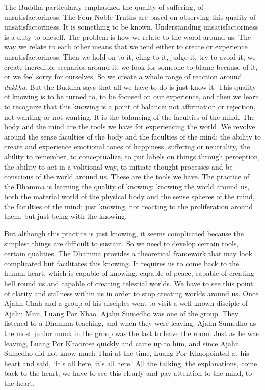 The Buddha particularly emphasized the quality of suffering, of
unsatisfactoriness. The Four Noble Truths are based on observing this
quality of unsatisfactoriness. It is something to be known.
Understanding unsatisfactoriness is a duty to oneself. The problem is
how we relate to the world around us. The way we relate to each other
means that we tend either to create or experience unsatisfactoriness.
Then we hold on to it, cling to it, judge it, try to avoid it; we create
incredible scenarios around it, we look for someone to blame because of
it, or we feel sorry for ourselves. So we create a whole range of
reaction around \emph{dukkha}. But the Buddha says that all we have to
do is just know it. This quality of knowing is to be turned to, to be
focused on our experience, and then we learn to recognize that this
knowing is a point of balance: not affirmation or rejection, not wanting
or not wanting. It is the balancing of the faculties of the mind. The
body and the mind are the tools we have for experiencing the world. We
revolve around the sense faculties of the body and the faculties of the
mind: the ability to create and experience emotional tones of happiness,
suffering or neutrality, the ability to remember, to conceptualize, to
put labels on things through perception, the ability to act in a
volitional way, to initiate thought processes and be conscious of the
world around us. These are the tools we have. The practice of the Dhamma
is learning the quality of knowing: knowing the world around us, both
the material world of the physical body and the sense spheres of the
mind, the faculties of the mind; just knowing, not reacting to the
proliferation around them, but just being with the knowing.

But although this practice is just knowing, it seems complicated because
the simplest things are difficult to sustain. So we need to develop
certain tools, certain qualities. The Dhamma provides a theoretical
framework that may look complicated but facilitates this knowing. It
requires us to come back to the human heart, which is capable of
knowing, capable of peace, capable of creating hell round us and capable
of creating celestial worlds. We have to see this point of clarity and
stillness within us in order to stop creating worlds around us. Once
Ajahn Chah and a group of his disciples went to visit a well-known
disciple of Ajahn Mun, Luang Por Khao. Ajahn Sumedho was one of the
group. They listened to a Dhamma teaching, and when they were leaving,
Ajahn Sumedho as the most junior monk in the group was the last to leave
the room. Just as he was leaving, Luang Por Khaorose quickly and came up
to him, and since Ajahn Sumedho did not know much Thai at the time,
Luang Por Khaopointed at his heart and said, `It's all here, it's all
here.' All the talking, the explanations, come back to the heart, we
have to see this clearly and pay attention to the mind, to the heart.


